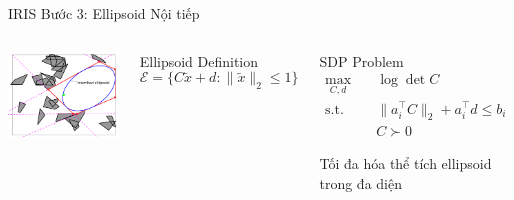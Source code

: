 \documentclass[aspectratio=169]{beamer}
\begin{document}
\begin{frame}{IRIS Bước 3: Ellipsoid Nội tiếp}
    \begin{columns}[c]
        \includegraphics[width=\textwidth]{../imgs/iris_2.png}

        \begin{block}{Ellipsoid Definition}
            \small
            \[
                \mathcal{E} = \{C\tilde{x} + d : \|\tilde{x}\|_2 \leq 1\}
            \]
        \end{block}

        \begin{block}{SDP Problem}
            \small
            \[
                \begin{aligned}
                    \max_{C,d} \quad  & \log \det C                            \\
                    \text{s.t.} \quad & \|a_i^\top C\|_2 + a_i^\top d \leq b_i \\
                                      & C \succ 0
                \end{aligned}
            \]

            Tối đa hóa thể tích ellipsoid trong đa diện
        \end{block}
    \end{columns}
\end{frame}
\end{document}
